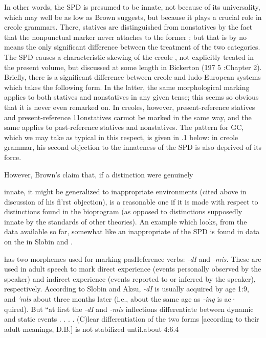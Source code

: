 In other words, the SPD is presumed to be innate, not because of its universality, which may well be as low as Brown suggests, but because it plays a crucial role in creole grammars. There, statives are distinguished from nonstatives by the fact that the nonpunctual marker never attaches to the former ; but that is by no means the only signifi\-cant difference between the treatment of the two categories. The SPD causes a characteristic skewing of the creole , not explicitly treated in the present volume, but discussed at some length in Bicker\-ton (197 5 :Chapter 2). Briefly, there is a significant difference between creole and ludo-European systems which takes the following form. In the latter, the same morphological marking applies to both statives and nonstatives in any given tense; this seems so obvious that it is never even remarked on. In creoles, however, present-reference statives and present-reference 11onstatives carmot be marked in the same way, and the same applies to past-reference statives and nonstatives. The pattern for GC, which we may take as typical in this respect, is given in .1 below:
in creole grammar, his second objection to the innateness of the SPD is also deprived of its force.

However, Brown's claim that, if a distinction were genuinely

innate, it might be generalized to inappropriate environments (cited above in discussion of his fi'rst objection), is a reasonable one if it is made with respect to distinctions found in the bioprogram (as opposed to distinctions supposedly innate by the standards of other theories). An example which looks, from the data available so far, somewhat like
an inappropriate  of the SPD is found in data on the
  in Slobin and \citet{Aksu1980}.

 has two morphemes used for marking pasHeference verbs: \textit{{}-dI} and \textit{{}-}\textit{m}\textit{i}\textit{s.} These are used in adult speech to mark direct experience (events personally observed by the speaker) and indirect experience (events reported to or inferred by the speaker), respectively. According to Slobin and Aksu, \textit{{}-dI} is usually acquired by age 1:9, and \textit{'mls} about three months later (i.e., about the same age as \textit{{}-i}\textit{n}\textit{g} is ac· quired). But ``at first the \textit{{}-dI} and \textit{{}-}\textit{m}\textit{i}\textit{s} inflections differentiate between dynamic and static events . . . . (C)lear differentiation of the two
forms [according to their adult meanings, D.B.] is not stabilized until.about 4:6.{\textquotedbl}4

